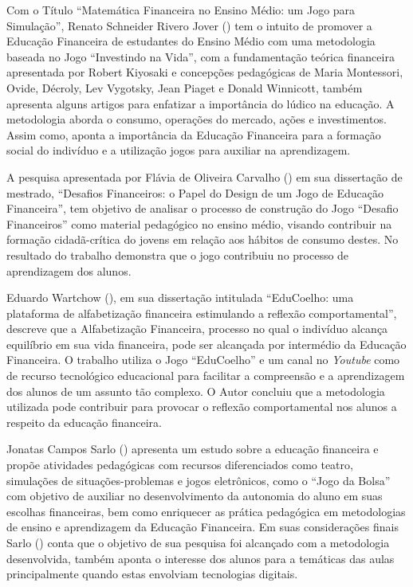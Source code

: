Com o Título “Matemática Financeira no Ensino Médio: um Jogo para Simulação”, Renato Schneider Rivero Jover (\citeyear{jover2014}) tem o intuito de promover a Educação Financeira de estudantes do Ensino Médio com uma metodologia baseada no Jogo “Investindo na Vida”, com a fundamentação teórica financeira apresentada por Robert Kiyosaki e concepções pedagógicas de Maria Montessori, Ovide, Décroly, Lev Vygotsky, Jean Piaget e Donald Winnicott, também apresenta alguns artigos para enfatizar a importância do lúdico na educação. A metodologia  aborda o consumo, operações do mercado, ações e investimentos. Assim como, aponta a importância da Educação Financeira para a formação social do indivíduo e a utilização jogos para auxiliar na aprendizagem.

A pesquisa apresentada por Flávia de Oliveira Carvalho (\citeyear{flavia2016}) em sua dissertação de mestrado,  “Desafios Financeiros: o Papel do Design de um Jogo de Educação Financeira”, tem objetivo de analisar o processo de construção do Jogo “Desafio Financeiros” como material pedagógico no ensino médio, visando contribuir na formação cidadã-crítica do jovens em relação aos hábitos de consumo destes. No resultado do trabalho demonstra que o jogo contribuiu no processo de aprendizagem dos alunos.

Eduardo Wartchow (\citeyear{wartchow2017}), em sua dissertação intitulada “EduCoelho: uma plataforma de alfabetização financeira estimulando a reflexão comportamental”, descreve que a Alfabetização Financeira, processo no qual o indivíduo alcança equilíbrio em sua vida financeira, pode ser alcançada por intermédio da Educação Financeira. O trabalho utiliza o Jogo “EduCoelho” e um canal no \textit{Youtube} como de recurso tecnológico educacional para facilitar a compreensão e a aprendizagem dos alunos de um assunto tão complexo. O Autor concluiu que a metodologia utilizada pode contribuir para provocar o reflexão comportamental nos alunos a respeito da educação financeira. 

Jonatas Campos Sarlo (\citeyear{sarlo2019}) apresenta um estudo sobre a educação financeira e propõe atividades pedagógicas com recursos diferenciados como teatro, simulações de situações-problemas e jogos eletrônicos, como o “Jogo da Bolsa” com objetivo de auxiliar no desenvolvimento da autonomia do aluno em suas escolhas financeiras, bem como enriquecer as prática pedagógica em metodologias de ensino e aprendizagem da Educação Financeira. Em suas considerações finais Sarlo (\citeyear{sarlo2019}) conta que o objetivo de sua pesquisa foi alcançado com a metodologia desenvolvida, também aponta o interesse dos alunos para a temáticas das aulas principalmente  quando estas envolviam tecnologias digitais.

